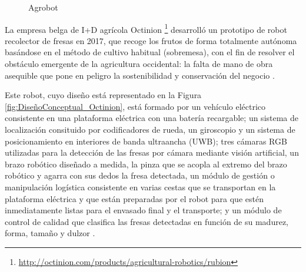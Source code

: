 \begin{figure}[H]
    \begin{center}
      \subcapcentertrue
      \hspace{2mm}
    \end{center}
    \caption{Agrobot}
    \label{fig:Agrobot}
  \end{figure}

La empresa belga de I+D agrícola Octinion \footnote{\url{http://octinion.com/products/agricultural-robotics/rubion}} desarrolló un prototipo de robot recolector de fresas en 2017, que recoge los frutos de forma totalmente autónoma basándose en el método de cultivo habitual (sobremesa), con el fin de resolver el obstáculo emergente de la agricultura occidental: la falta de mano de obra asequible que pone en peligro la sostenibilidad y conservación del negocio \cite{DePreter18}.

Este robot, cuyo diseño está representado en la Figura \ref{fig:DiseñoConceptual_Octinion}, está formado por un vehículo eléctrico consistente en una plataforma eléctrica con una batería recargable; un sistema de localización consituido por codificadores de rueda, un giroscopio y un sistema de posicionamiento en interiores de banda ultraancha (UWB); tres cámaras RGB utilizadas para la detección de las fresas por cámara mediante visión artificial, un brazo robótico diseñado a medida, la pinza que se acopla al extremo del brazo robótico y agarra con sus dedos la fresa detectada, un módulo de gestión o manipulación logística consistente en varias cestas que se transportan en la plataforma eléctrica y que están preparadas por el robot para que estén inmediatamente listas para el envasado final y el transporte; y un módulo de control de calidad que clasifica las fresas detectadas en función de su madurez, forma, tamaño y dulzor \cite{DePreter18}.

